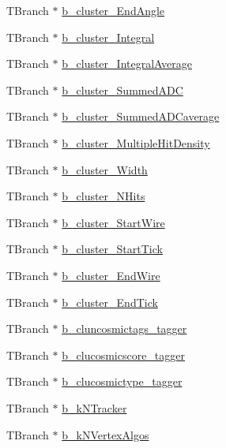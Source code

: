 \begin{DoxyCompactItemize}
\item 
T\-Branch $\ast$ \hyperlink{classanatree_ad6e7df50c518750daa91c7f447ee9a04}{b\-\_\-cluster\-\_\-\-End\-Angle}
\item 
T\-Branch $\ast$ \hyperlink{classanatree_a4a45463d85ac0494284b863cf82d9416}{b\-\_\-cluster\-\_\-\-Integral}
\item 
T\-Branch $\ast$ \hyperlink{classanatree_a42c14008297e2742a79b13140d105054}{b\-\_\-cluster\-\_\-\-Integral\-Average}
\item 
T\-Branch $\ast$ \hyperlink{classanatree_a1bb7cf91bff421bef31aaf87725e904f}{b\-\_\-cluster\-\_\-\-Summed\-A\-D\-C}
\item 
T\-Branch $\ast$ \hyperlink{classanatree_ab7023e11831e39619f69edf88400a0a7}{b\-\_\-cluster\-\_\-\-Summed\-A\-D\-Caverage}
\item 
T\-Branch $\ast$ \hyperlink{classanatree_a3ad1ce127e92e536189b2614477a49c5}{b\-\_\-cluster\-\_\-\-Multiple\-Hit\-Density}
\item 
T\-Branch $\ast$ \hyperlink{classanatree_a7a61097f1417a99882831d6bbe533b2a}{b\-\_\-cluster\-\_\-\-Width}
\item 
T\-Branch $\ast$ \hyperlink{classanatree_a0689fef71e05e95cb2ddb854c5201995}{b\-\_\-cluster\-\_\-\-N\-Hits}
\item 
T\-Branch $\ast$ \hyperlink{classanatree_aeec86e185d9e0bc3163fc88cdb6019da}{b\-\_\-cluster\-\_\-\-Start\-Wire}
\item 
T\-Branch $\ast$ \hyperlink{classanatree_a5be78fd80b6792d715e6214a52a7daac}{b\-\_\-cluster\-\_\-\-Start\-Tick}
\item 
T\-Branch $\ast$ \hyperlink{classanatree_aac8d0d8d9cb33a643c3dab8c288b359e}{b\-\_\-cluster\-\_\-\-End\-Wire}
\item 
T\-Branch $\ast$ \hyperlink{classanatree_ab16577aff6679ce7ae82fa9a4adbc9c7}{b\-\_\-cluster\-\_\-\-End\-Tick}
\item 
T\-Branch $\ast$ \hyperlink{classanatree_abe945439379a574fc5b69fc4ee2453ed}{b\-\_\-cluncosmictags\-\_\-tagger}
\item 
T\-Branch $\ast$ \hyperlink{classanatree_a6b67c908760fa144f00052e85231ea2f}{b\-\_\-clucosmicscore\-\_\-tagger}
\item 
T\-Branch $\ast$ \hyperlink{classanatree_a6275dc9d3c86fdf0c9dbafb7671b422b}{b\-\_\-clucosmictype\-\_\-tagger}
\item 
T\-Branch $\ast$ \hyperlink{classanatree_a11fffb6adcecb18efeb0016f7fdb9a4e}{b\-\_\-k\-N\-Tracker}
\item 
T\-Branch $\ast$ \hyperlink{classanatree_afcc51723700a9295e5ab30ecf95342a1}{b\-\_\-k\-N\-Vertex\-Algos}

\end{DoxyCompactItemize}
